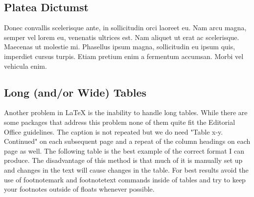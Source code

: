 \subsection{Platea Dictumst}
Donec convallis scelerisque ante, in sollicitudin orci laoreet eu. Nam arcu magna, semper vel lorem eu, venenatis ultrices est. Nam aliquet ut erat ac scelerisque. Maecenas ut molestie mi. Phasellus ipsum magna, sollicitudin eu ipsum quis, imperdiet cursus turpis. Etiam pretium enim a fermentum accumsan. Morbi vel vehicula enim.


\subsection{Long (and/or Wide) Tables}

Another problem in LaTeX is the inability to handle long tables. While there are some packages that address this problem none of them quite fit the Editorial Office guidelines. The caption is not repeated but we do need "Table x-y. Continued" on each subsequent page and a repeat of the column headings on each page as well. The following table is the best example of the correct format I can produce. The disadvantage of this method is that much of it is manually set up and changes in the text will cause changes in the table. \citep{Moffatt69} For best results avoid the use of footnotemark and footnotetext commands inside of tables and try to keep your footnotes outside of floats whenever possible.



